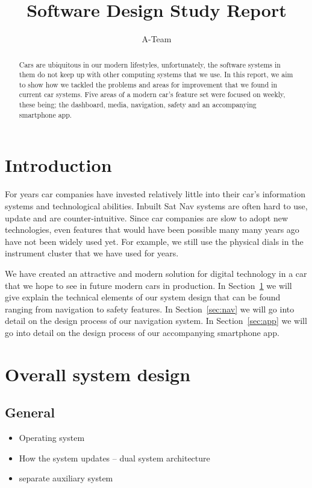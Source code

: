 \documentclass{article}
\title{Software Design Study Report}
\author{A-Team}
\begin{document}
\maketitle

\begin{abstract}
  Cars are ubiquitous in our modern lifestyles, unfortunately, the software systems in them do not keep up with other computing systems that we use. In this report, we aim to show how we tackled the problems and areas for improvement that we found in current car systems. Five areas of a modern car's feature set were focused on weekly, these being; the dashboard, media, navigation, safety and an accompanying smartphone app.
\end{abstract}

\section*{Introduction}
For years car companies have invested relatively little into their car's information systems and technological abilities. Inbuilt Sat Nav systems are often hard to use, update and are counter-intuitive. Since car companies are slow to adopt new technologies, even features that would have been possible many many years ago have not been widely used yet. For example, we still use the physical dials in the instrument cluster that we have used for years.

We have created an attractive and modern solution for digital technology in a car that we hope to see in future modern cars in production. In Section~\ref{sec:system-design} we will give explain the technical elements of our system design that can be found ranging from navigation to safety features. In Section~\ref{sec:nav} we will go into detail on the design process of our navigation system. In Section~\ref{sec:app} we will go into detail on the design process of our accompanying smartphone app.

\section{Overall system design}\label{sec:system-design}
\subsection{General}


\begin{itemize}
  \item Operating system
  \item How the system updates -- dual system architecture
  \item separate auxiliary system
 
\end{itemize}
\end{document}

